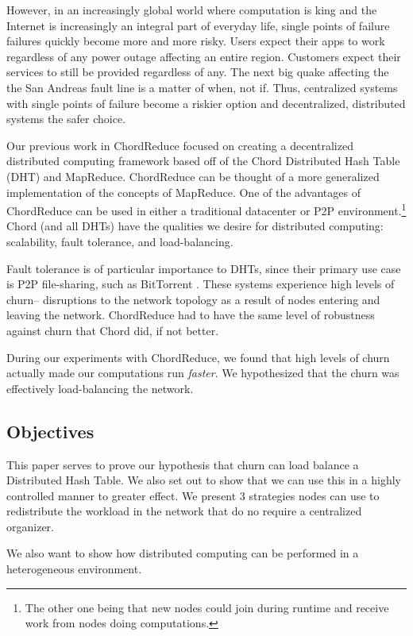 However, in an increasingly global world where computation is king and the Internet is increasingly an integral part of everyday life, single points of failure failures quickly become more and more risky.
Users expect their apps to work regardless of any power outage affecting an entire region.
Customers expect their services to still be provided regardless of any.
The next big quake affecting the the San Andreas fault line is a matter of when, not if.
Thus, centralized systems with single points of failure become a riskier option and decentralized, distributed systems the safer choice.


Our previous work in ChordReduce \cite{chordreduce} focused on creating a decentralized distributed computing framework based off of the Chord Distributed Hash Table (DHT) and MapReduce.
ChordReduce can be thought of a more generalized implementation of the concepts of MapReduce.
One of the advantages of ChordReduce can be used in either a traditional datacenter or P2P environment.\footnote{The other one being that new nodes could join during runtime and receive work from nodes doing computations.}
Chord (and all DHTs) have the qualities we desire for distributed computing: scalability, fault tolerance, and load-balancing.

Fault tolerance is of particular importance to DHTs, since their primary use case is P2P file-sharing, such as BitTorrent \cite{bittorrent}.
These systems experience high levels of churn-- disruptions to the network topology as a result of nodes entering and leaving the network.
ChordReduce had to have the same level of robustness against churn that Chord did, if not better.

During our experiments with ChordReduce, we found that high levels of churn actually made our computations run \textit{faster}.
We hypothesized that the churn was effectively load-balancing the network.

\subsection{Objectives}
This paper serves to prove our hypothesis that churn can load balance a Distributed Hash Table.
We also set out to show that we can use this in a highly controlled manner to greater effect.
We present 3 strategies nodes can use to redistribute the workload in the network that do no require a centralized organizer.

We also want to show how distributed computing can be performed in a heterogeneous environment.

